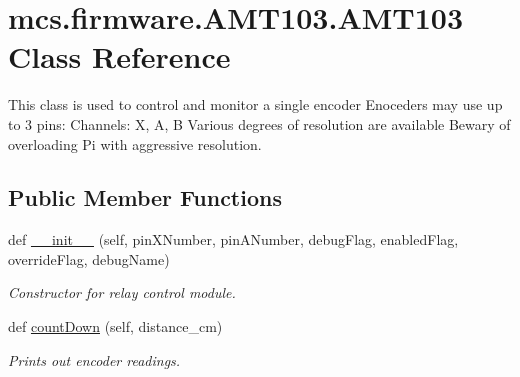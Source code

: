 \hypertarget{classmcs_1_1firmware_1_1AMT103_1_1AMT103}{}\section{mcs.\+firmware.\+A\+M\+T103.\+A\+M\+T103 Class Reference}
\label{classmcs_1_1firmware_1_1AMT103_1_1AMT103}


This class is used to control and monitor a single encoder Enoceders may use up to 3 pins\+: Channels\+: X, A, B Various degrees of resolution are available Bewary of overloading Pi with aggressive resolution.  


\subsection*{Public Member Functions}
\begin{DoxyCompactItemize}
\item 
def \hyperlink{classmcs_1_1firmware_1_1AMT103_1_1AMT103_a11608d8fb67ad83c74feb8f81aa84391}{\+\_\+\+\_\+init\+\_\+\+\_\+} (self, pin\+X\+Number, pin\+A\+Number, debug\+Flag, enabled\+Flag, override\+Flag, debug\+Name)
\begin{DoxyCompactList}\small\item\em Constructor for relay control module. \end{DoxyCompactList}\item 
def \hyperlink{classmcs_1_1firmware_1_1AMT103_1_1AMT103_a97d6ba22a18b6d03cea5f6da60f1c6e8}{count\+Down} (self, distance\+\_\+cm)
\begin{DoxyCompactList}\small\item\em Prints out encoder readings. \end{DoxyCompactList}\end{DoxyCompactItemize}
